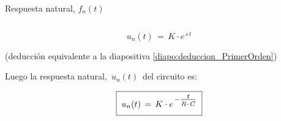 \documentclass[aspectratio=169, usenames,svgnames,dvipsnames]{beamer}
\begin{document}
\begin{frame}{Respuesta natural, \hspace{3mm}$f_n(t)$}
\begin{columns}
\begin{column}{0.55\columnwidth}
        \vspace{-2mm}
        \[
          \boxed{\; u_n(t) \,=\, K \cdot e^{\,s\,t} \;}
        \]
        \begin{center}
            {\small(deducción equivalente a la diapositiva \ref{diapo:deduccion_PrimerOrden})}
        \end{center}

        \vspace{1mm}
        Luego la \alert{respuesta natural}, $\, u_n(t)\,$ del circuito es: 

        \vspace{-2mm}
        \[
          \boxed{\; \vphantom{\dfrac{a}{a}} u_n(t) \,=\, K \cdot e^{\,-\frac{\vphantom{j} \scalebox{1.5} {\tiny \textit{t}}}{\vphantom{\scalebox{2} {\tiny \textit{R C}}} \scalebox{1.5} {\tiny \textit{R$\cdot$C}}}} \;}
        \]
    \end{column}
    \end{columns}  
\end{frame}

\end{document}
